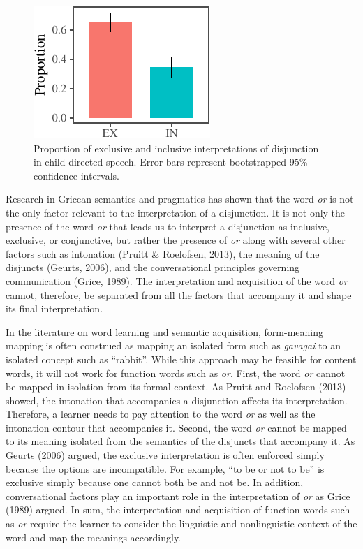 \documentclass[floatsintext,man]{apa6}
\theoremstyle{definition}
\theoremstyle{definition}
\theoremstyle{definition}
\theoremstyle{remark}
\begin{document}
\begin{figure}[tb]

{\centering \includegraphics{figs/interpretation-1} 

}

\caption{Proportion of exclusive and inclusive interpretations of disjunction in child-directed speech. Error bars represent bootstrapped 95\% confidence intervals.}\label{fig:interpretation}
\end{figure}

Research in Gricean semantics and pragmatics has shown that the word
\emph{or} is not the only factor relevant to the interpretation of a
disjunction. It is not only the presence of the word \emph{or} that
leads us to interpret a disjunction as inclusive, exclusive, or
conjunctive, but rather the presence of \emph{or} along with several
other factors such as intonation (Pruitt \& Roelofsen, 2013), the
meaning of the disjuncts (Geurts, 2006), and the conversational
principles governing communication (Grice, 1989). The interpretation and
acquisition of the word \emph{or} cannot, therefore, be separated from
all the factors that accompany it and shape its final interpretation.

In the literature on word learning and semantic acquisition,
form-meaning mapping is often construed as mapping an isolated form such
as \emph{gavagai} to an isolated concept such as \enquote{rabbit}. While
this approach may be feasible for content words, it will not work for
function words such as \emph{or}. First, the word \emph{or} cannot be
mapped in isolation from its formal context. As Pruitt and Roelofsen
(2013) showed, the intonation that accompanies a disjunction affects its
interpretation. Therefore, a learner needs to pay attention to the word
\emph{or} as well as the intonation contour that accompanies it. Second,
the word \emph{or} cannot be mapped to its meaning isolated from the
semantics of the disjuncts that accompany it. As Geurts (2006) argued,
the exclusive interpretation is often enforced simply because the
options are incompatible. For example, \enquote{to be or not to be} is
exclusive simply because one cannot both be and not be. In addition,
conversational factors play an important role in the interpretation of
\emph{or} as Grice (1989) argued. In sum, the interpretation and
acquisition of function words such as \emph{or} require the learner to
consider the linguistic and nonlinguistic context of the word and map
the meanings accordingly.
\end{document}
